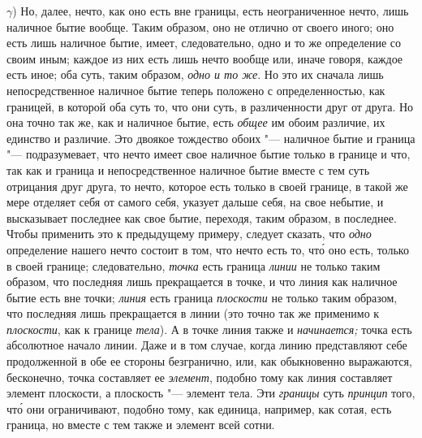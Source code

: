 $\gamma$) Но, далее, нечто, как оно есть вне границы, есть
неограниченное нечто, лишь наличное бытие вообще. Таким образом, оно не
отлично от своего иного; оно есть лишь наличное бытие, имеет,
следовательно, одно и то же определение со своим иным; каждое из них есть
лишь нечто вообще или, иначе говоря, каждое есть иное; оба суть, таким
образом, {\em одно и то же}. Но это их сначала лишь
непосредственное наличное бытие теперь положено с определенностью, как
границей, в которой оба суть то, что они суть, в различенности друг от
друга. Но она точно так же, как и наличное бытие, есть
{\em общее} им обоим различие, их единство и различие.
Это двоякое тождество обоих "--- наличное бытие и граница "--- подразумевает, что
нечто имеет свое наличное бытие только в границе и что, так как и граница и
непосредственное наличное бытие вместе с тем суть отрицания друг друга, то
нечто, которое есть только в своей границе, в такой же мере отделяет себя
от самого себя, указует дальше себя, на свое небытие, и высказывает
последнее как свое бытие, переходя, таким образом, в последнее. Чтобы
применить это к предыдущему примеру, следует сказать, что
{\em одно} определение нашего нечто состоит в том, что
нечто есть то, чт\'{о} оно есть, только в своей границе; следовательно,
{\em точка} есть граница
{\em линии} не только таким образом, что последняя лишь
прекращается в точке, и что линия как наличное бытие есть вне точки;
{\em линия} есть граница
{\em плоскости} не только таким образом, что последняя
лишь прекращается в линии (это точно так же применимо к
{\em плоскости}, как к границе
{\em тела}). А в точке линия также и
{\em начинается;} точка есть абсолютное начало линии.
Даже и в том случае, когда линию представляют себе продолженной в обе ее
стороны безгранично, или, как обыкновенно выражаются, бесконечно, точка
составляет ее {\em элемент}, подобно тому как линия
составляет элемент плоскости, а плоскость "--- элемент тела. Эти
{\em границы} суть {\em принцип}
того, чт\'{о} они ограничивают, подобно тому, как единица, например, как сотая,
есть граница, но вместе с тем также и элемент всей сотни.

